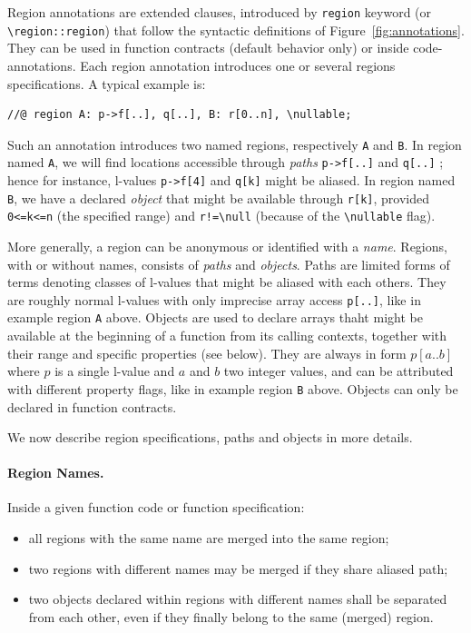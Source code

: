 Region annotations are extended \acsl clauses, introduced by
\verb+region+ keyword (or \verb+\region::region+) that follow the syntactic
definitions of Figure~\ref{fig:annotations}. They can be used in function
contracts (default behavior only) or inside code-annotations.
Each region annotation introduces one or several regions specifications.
A typical example is:

\begin{lstlisting}
//@ region A: p->f[..], q[..], B: r[0..n], \nullable;
\end{lstlisting}

Such an annotation introduces two named regions, respectively \verb+A+ and
\verb+B+. In region named \verb+A+, we will find locations accessible through
\emph{paths} \verb+p->f[..]+ and \verb+q[..]+ ; hence for instance, l-values
\verb+p->f[4]+ and \verb+q[k]+ might be aliased. In region named \verb+B+, we
have a declared \emph{object} that might be available through \verb$r[k]$,
provided \verb$0<=k<=n$ (the specified range) and \verb$r!=\null$ (because of
the \verb+\nullable+ flag).

More generally, a region can be anonymous or identified with a \emph{name}.
Regions, with or without names, consists of \emph{paths} and \emph{objects}.
Paths are limited forms of \acsl terms denoting classes of l-values that might
be aliased with each others. They are roughly normal l-values with only
imprecise array access \verb$p[..]$, like in example region \verb+A+ above.
Objects are used to declare arrays thaht might be available at the beginning of
a function from its calling contexts, together with their range and specific
properties (see below). They are always in form $p[a..b]$ where $p$ is a single
l-value and $a$ and $b$ two integer values, and can be attributed with different
property flags, like in example region \verb+B+ above. Objects can only be
declared in function contracts.

We now describe region specifications, paths and objects in more details.

\paragraph{Region Names.} Inside a given function code or function
specification:
\begin{itemize}
  \item all regions with the same name are merged into the same region;
  \item two regions with different names may be merged if they share aliased path;
  \item two objects declared within regions with different names shall be
  separated from each other, even if they finally belong to the same (merged)
  region.
\end{itemize}

